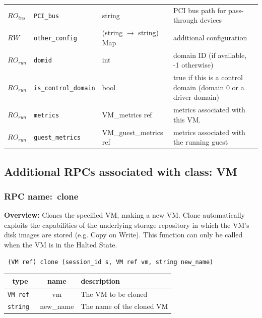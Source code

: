 \begin{longtable}{|lllp{}|}
$\mathit{RO}_\mathit{ins}$ &  {\tt PCI\_bus} & string & PCI bus path for pass-through devices \\
$\mathit{RW}$ &  {\tt other\_config} & (string $\rightarrow$ string) Map & additional configuration \\
$\mathit{RO}_\mathit{run}$ &  {\tt domid} & int & domain ID (if available, -1 otherwise) \\
$\mathit{RO}_\mathit{run}$ &  {\tt is\_control\_domain} & bool & true if this is a control domain (domain 0 or a driver domain) \\
$\mathit{RO}_\mathit{run}$ &  {\tt metrics} & VM\_metrics ref & metrics associated with this VM. \\
$\mathit{RO}_\mathit{run}$ &  {\tt guest\_metrics} & VM\_guest\_metrics ref & metrics associated with the running guest \\
\hline
\end{longtable}
\subsection{Additional RPCs associated with class: VM}
\subsubsection{RPC name:~clone}

{\bf Overview:} 
Clones the specified VM, making a new VM. Clone automatically exploits the
capabilities of the underlying storage repository in which the VM's disk
images are stored (e.g. Copy on Write).   This function can only be called
when the VM is in the Halted State.

\begin{verbatim} (VM ref) clone (session_id s, VM ref vm, string new_name)\end{verbatim}



 
\vspace{0.3cm}
\begin{tabular}{|c|c|p{7cm}|}
 \hline
{\bf type} & {\bf name} & {\bf description} \\ \hline
{\tt VM ref } & vm & The VM to be cloned \\ \hline 

{\tt string } & new\_name & The name of the cloned VM \\ \hline 

\end{tabular}

